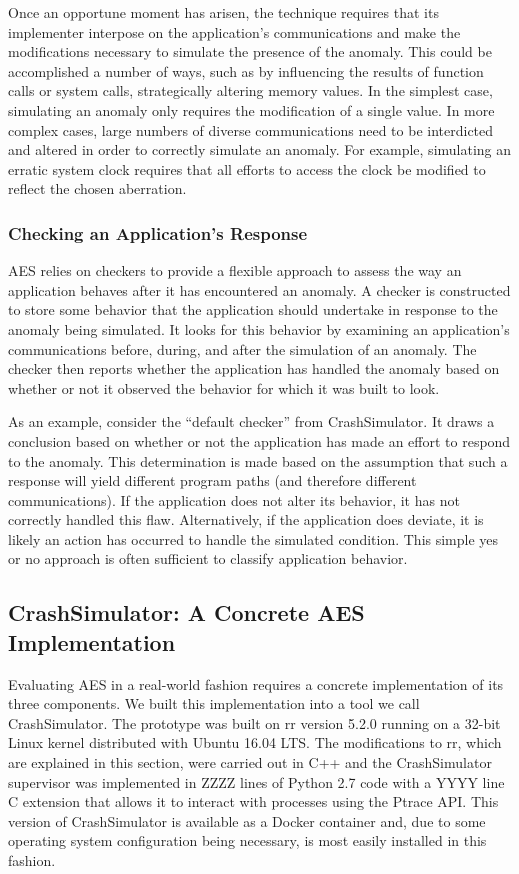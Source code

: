Once an opportune moment has arisen,
the technique requires that its implementer
interpose on the application's communications
and make the modifications necessary
to simulate the presence
of the anomaly.
This could be accomplished
a number of ways,
such as
by influencing the results of function calls or system calls,
strategically altering memory values.
In the simplest case,
simulating an anomaly only requires
the modification of a single value.
In more complex cases,
large numbers of diverse communications
need to be interdicted and altered
in order to correctly simulate an anomaly.
For example,
simulating an erratic system clock
requires that all efforts
to access the clock
be modified to reflect the chosen aberration.

\subsubsection{Checking an Application's Response}
\label{SUBSUB:CheckingResponse}
AES relies on checkers
to provide a flexible approach to assess the way an application
behaves after it has encountered an anomaly.
A checker is constructed to store
some behavior that the application should undertake
in response to the anomaly being simulated.
It looks for this behavior by examining an application's communications
before, during, and after the simulation of an anomaly.
The checker then reports whether the application has handled
the anomaly based on whether or not it observed the behavior for which it
was built to look.

As an example, consider the ``default checker'' from CrashSimulator.
It draws a conclusion based on
whether or not the application
has made an effort to respond
to the anomaly.
This determination is made based
on the assumption
that such a response will yield
different program paths (and therefore different communications).
If the application
does not alter its behavior, it has not
correctly handled this flaw.
Alternatively,
if the application does deviate,
it is likely
an action has occurred to handle the simulated condition.
This simple yes or no approach
is often sufficient
to classify application behavior.



\subsection{CrashSimulator: A Concrete AES Implementation}
\label{SUBSEC:ApproachCrashSim}
Evaluating AES in a real-world fashion requires a
concrete implementation of its three components.
We built this implementation into a tool we call CrashSimulator.  The
prototype was built on rr version 5.2.0 running on a 32-bit Linux kernel
distributed with Ubuntu 16.04 LTS.  The modifications to rr, which are
explained in this section, were carried out in C++ and the CrashSimulator
supervisor was implemented in ZZZZ lines of Python 2.7 code with a YYYY
line C extension that allows it to interact with processes using the Ptrace
API.
This version of CrashSimulator is available as a Docker container and,
due to some operating system configuration being necessary, is most easily
installed in this fashion.

